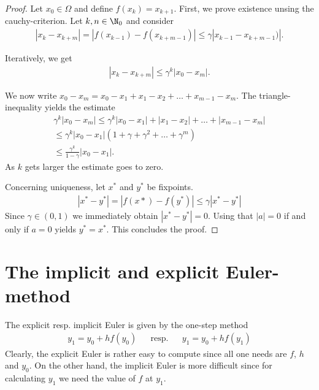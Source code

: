 \begin{proof}
	Let $x_0 \in \Omega$ and define $f(x_k) = x_{k+1}$. First, we prove
	existence unsing the cauchy-criterion. Let $k, n \in \N_0$ and consider
	\begin{gather*}
	|x_k - x_{k+m} | = |f(x_{k-1}) - f(x_{k+m-1})| \le \gamma |x_{k-1} - x_{k+m-1})|.
	\end{gather*}

	Iteratively, we get
	\begin{gather*}
	|x_k - x_{k+m} | \le \gamma^k |x_0 - x_m|.
	\end{gather*}

	We now write $x_0 - x_m = x_0 - x_1 + x_1 - x_2 + \dots + x_{m-1} - x_m$.
	The triangle-inequality yields the estimate
	\begin{gather*}
	\gamma^k |x_0 - x_m| \le \gamma^k |x_0 - x_1| + |x_1 - x_2| + \dots + |x_{m-1} - x_m|  \\
	\le \gamma^k |x_0 - x_1| (1 + \gamma + \gamma ^2 + \dots + \gamma^m) \\
	\le \frac{\gamma^k}{1-\gamma} |x_0 - x_1|.
	\end{gather*}
	As $k$ gets larger the estimate goes to zero.

	Concerning uniqueness, let $x^*$ and $y^*$ be fixpoints.
	\begin{gather*}
	|x^* - y^*| = |f(x*) - f(y^*) | \le \gamma |x^* - y^*|
	\end{gather*}
	Since $\gamma \in (0,1)$ we immediately obtain $|x^* - y^*| = 0$. Using
	that $|a| = 0$ if and only if $a=0$ yields $y^* = x^*$. This concludes the proof.
\end{proof}

\section{The implicit and explicit Euler-method}

	The explicit resp. implicit Euler is given by the one-step method
	\begin{align*}
	&& y_1 = y_0 + h f(y_0) && \text{resp.} && y_1 = y_0 + h f(y_1) &&
	\end{align*}
	Clearly, the explicit Euler is rather easy to compute since all one
	needs are $f$, $h$ and $y_0$. On the other hand, the implicit Euler
	is more difficult since for calculating $y_1$ we need the value of $f$ at $y_1$.

